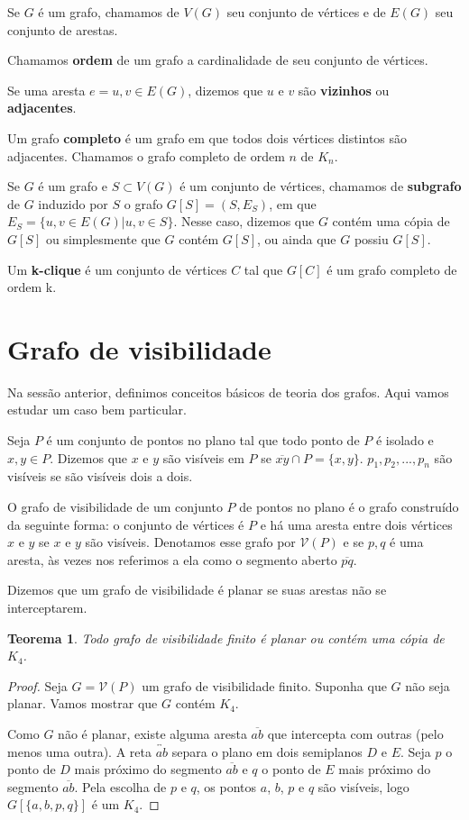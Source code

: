 \documentclass[a4paper]{book}
\newtheorem{teorema}{Teorema}[section]
\begin{document}
Se $G$ é um grafo, chamamos de $V(G)$ seu conjunto de vértices e de $E(G)$ seu conjunto de arestas.

Chamamos \textbf{ordem} de um grafo a cardinalidade de seu conjunto de vértices.

Se uma aresta $e={u,v}\in E(G)$, dizemos que $u$ e $v$ são \textbf{vizinhos} ou \textbf{adjacentes}.

Um grafo \textbf{completo} é um grafo em que todos dois vértices distintos são adjacentes. Chamamos o grafo completo de ordem $n$ de $K_n$.

Se $G$ é um grafo e  $S\subset V(G)$ é um conjunto de vértices, chamamos de \textbf{subgrafo} de $G$ induzido por $S$ o grafo $G[S]=(S,E_S)$, em que $E_S=\{{u,v}\in E(G)|u,v\in S\}$. Nesse caso, dizemos que $G$ contém uma cópia de $G[S]$ ou simplesmente que $G$ contém $G[S]$, ou ainda que $G$ possiu $G[S]$.

Um \textbf{k-clique} é um conjunto de vértices $C$ tal que $G[C]$ é um grafo completo de ordem k.

\section{Grafo de visibilidade}
Na sessão anterior, definimos conceitos básicos de teoria dos grafos. Aqui vamos estudar um caso bem particular.

Seja $P$ é um conjunto de pontos no plano tal que todo ponto de $P$ é isolado e $x,y\in P$. Dizemos que $x$ e $y$ são visíveis em $P$ se $\overline{xy}\cap P =\{x,y\}$. $p_1, p_2, ..., p_n$ são visíveis se são visíveis dois a dois.

O grafo de visibilidade de um conjunto $P$ de pontos no plano é o grafo construído da seguinte forma: o conjunto de vértices é $P$ e há uma aresta entre dois vértices $x$ e $y$ se $x$ e $y$ são visíveis. Denotamos esse grafo por $\mathcal V(P)$ e se ${p,q}$ é uma aresta, às vezes nos referimos a ela como o segmento aberto $\overline{pq}$.

Dizemos que um grafo de visibilidade é planar se suas arestas não se interceptarem.

\begin{teorema}\cite{visibility}\label{planork4}
    Todo grafo de visibilidade finito é planar ou contém uma cópia de $K_4$.
\end{teorema}
\begin{proof}
Seja $G=\mathcal V(P)$ um grafo de visibilidade finito. Suponha que $G$ não seja planar. Vamos mostrar que $G$ contém $K_4$.

Como $G$ não é planar, existe alguma aresta $\overline{ab}$ que intercepta com outras (pelo menos uma outra). A reta $\overleftrightarrow{ab}$ separa o plano em dois semiplanos $D$ e $E$. Seja $p$ o ponto de $D$ mais próximo do segmento $\overline{ab}$ e $q$ o ponto de $E$ mais próximo do segmento $\overline{ab}$. Pela escolha de $p$ e $q$, os pontos $a$, $b$, $p$ e $q$ são visíveis, logo $G[\{a,b,p,q\}]$ é um $K_4$.
\end{proof}
\end{document}
